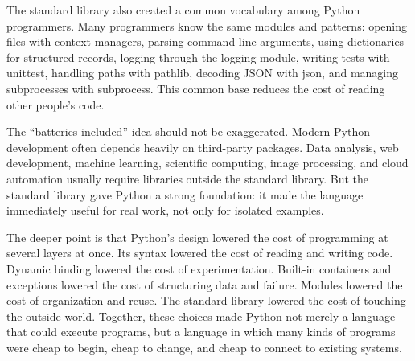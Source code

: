 The standard library also created a common vocabulary among Python programmers. Many programmers know the same modules and patterns: opening files with context managers, parsing command-line arguments, using dictionaries for structured records, logging through the logging module, writing tests with unittest, handling paths with pathlib, decoding JSON with json, and managing subprocesses with subprocess. This common base reduces the cost of reading other people's code.

The ``batteries included'' idea should not be exaggerated. Modern Python development often depends heavily on third-party packages. Data analysis, web development, machine learning, scientific computing, image processing, and cloud automation usually require libraries outside the standard library. But the standard library gave Python a strong foundation: it made the language immediately useful for real work, not only for isolated examples.

The deeper point is that Python's design lowered the cost of programming at several layers at once. Its syntax lowered the cost of reading and writing code. Dynamic binding lowered the cost of experimentation. Built-in containers and exceptions lowered the cost of structuring data and failure. Modules lowered the cost of organization and reuse. The standard library lowered the cost of touching the outside world. Together, these choices made Python not merely a language that could execute programs, but a language in which many kinds of programs were cheap to begin, cheap to change, and cheap to connect to existing systems.